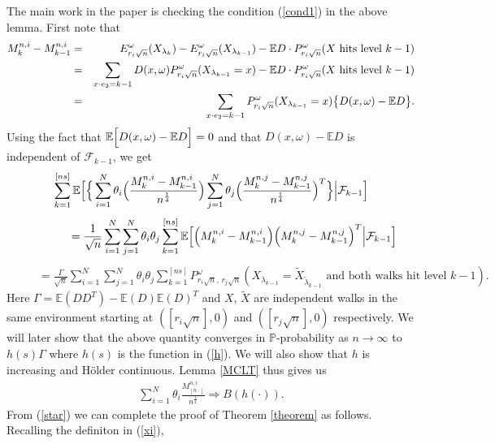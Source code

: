 \documentclass[11pt]{amsart}
\begin{document}
The main work in the paper is checking the condition (\ref{cond1}) in the above lemma. First note that
\begin{eqnarray*}
 M_k^{n,i}-M_{k-1}^{n,i}
&=& E_{r_i\sqrt{n}}^{\omega}( X_{\lambda_k})- E_{r_i\sqrt{n}}^{\omega}( X_{\lambda_{k-1}})- \mathbb{E}D \cdot P_{r_i\sqrt{n}}^{\omega}(X \mbox{ hits level } k-1) \\
&=& \sum_{x \cdot e_2 = k-1} D(x,\omega) P_{r_i\sqrt{n}}^{\omega}(X_{\lambda_{k-1}}=x) -\mathbb{E}D \cdot P_{r_i\sqrt{n}}^{\omega}(X \mbox{ hits level } k-1) \\
&=& \sum_{x \cdot e_2 = k-1} P_{r_i\sqrt{n}}^{\omega} (X_{\lambda_{k-1}} = x) \big{\lbrace}D(x,\omega) - \mathbb{E}D \big{\rbrace}.
\end{eqnarray*}
Using the fact that $\mathbb{E}\Big{[} D(x,\omega)- \mathbb{E}D \Big{]}=0$ and that $D(x,\omega)- \mathbb{E}D$ is independent of $\mathcal{F}_{k-1}$, we get
\[ \sum_{k=1}^{[ns]} \mathbb{E}\Big{[} \Big{\lbrace} \sum_{i=1}^N\theta_i\Big{(}\frac{M_k^{n,i}-M_{k-1}^{n,i}  }{n^{\frac{1}{4}} } \Big{)}\sum_{j=1}^N \theta_j \Big{(} \frac{M_k^{n,j}-M_{k-1}^{n,j} }{n^{\frac{1}{4}} }\Big{)}^T\Big{\rbrace}  \Big{\vert} \mathcal{F}_{k-1}\Big{]}\]
\[ \qquad \qquad = \frac{1}{\sqrt{n}}\sum_{i=1}^N\sum_{j=1}^N \theta_i \theta_j \sum_{k=1}^{[ns]} \mathbb{E} \Big{[}\Big{(} M_k^{n,i}-M_{k-1}^{n,i }  \Big{)}\Big{(} M_k^{n,j}-M_{k-1}^{n,j } \Big{)}^T \Big{\vert} \mathcal{F}_{k-1}\Big{]}\]
\begin{eqnarray}
\label{eqn}
 \hspace{1cm} = \frac{\Gamma}{\sqrt{n}}\sum_{i=1}^N\sum_{j=1}^N \theta_i \theta_j \sum_{k=1}^{[ns]} P^{\omega}_{r_i \sqrt{n},\, r_j \sqrt{n}}
 (X_{\lambda_{k-1}}= \tilde{X}_{\tilde{\lambda}_{k-1}} \mbox{ and both walks hit level }k-1). 
 \end{eqnarray}
Here $\Gamma= \mathbb{E}(DD^T)-\mathbb{E}(D)\mathbb{E}(D)^{T}$ and $X$, $\tilde{X}$ are independent walks in the same environment starting at $([r_i\sqrt{n} ],0)$ and $([r_j \sqrt{n} ],0)$ respectively. We will later show that the above quantity converges in $\mathbb{P}$-probability as $n \rightarrow \infty$ to $h(s)\Gamma $ where $h(s)$ is the function in (\ref{h}). We will also show that $h$ is increasing and H\"older continuous. Lemma \ref{MCLT} thus gives us
\begin{eqnarray}
 \label{star}
 \sum_{i=1}^N \theta_i \frac{ M^{n,i}_{[n\cdot]}}{n^{\frac{1}{4}}} \Rightarrow B(h(\cdot)).
 \end{eqnarray}
 From (\ref{star}) we can complete the proof of Theorem \ref{theorem} as follows. Recalling the definiton in (\ref{xi}),
\end{document}
